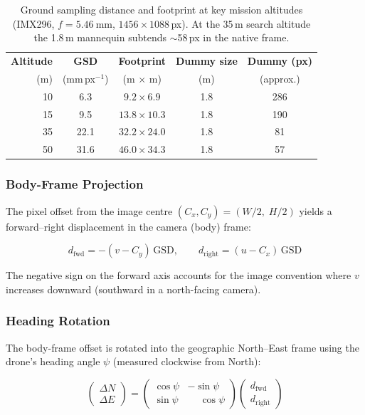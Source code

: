 \begin{table}[ht]
  \centering
  \caption{Ground sampling distance and footprint at key mission altitudes (IMX296, $f = \SI{5.46}{\milli\metre}$, $1456\!\times\!1088$\,px).  At the 35\,m search altitude the 1.8\,m mannequin subtends ${\sim}$58\,px in the native frame.}
  \label{tab:gsd-altitude}
  \begin{tabular}{rcccc}
    \toprule
    \textbf{Altitude} & \textbf{GSD} & \textbf{Footprint} & \textbf{Dummy size} & \textbf{Dummy (px)} \\
    (m) & (mm\,px$^{-1}$) & (m $\times$ m) & (m) & (approx.) \\
    \midrule
    10  & 6.3  & $9.2 \times 6.9$   & 1.8 & 286 \\
    15  & 9.5  & $13.8 \times 10.3$ & 1.8 & 190 \\
    35  & 22.1 & $32.2 \times 24.0$ & 1.8 & 81  \\
    50  & 31.6 & $46.0 \times 34.3$ & 1.8 & 57  \\
    \bottomrule
  \end{tabular}
\end{table}

\subsubsection{Body-Frame Projection}

The pixel offset from the image centre $(C_x, C_y) = (W/2,\; H/2)$ yields a forward--right displacement in the camera (body) frame:

\begin{equation}\label{eq:body-deep}
  d_\mathrm{fwd} = -(v - C_y)\,\mathrm{GSD},
  \qquad
  d_\mathrm{right} = (u - C_x)\,\mathrm{GSD}
\end{equation}

\noindent The negative sign on the forward axis accounts for the image convention where $v$ increases downward (southward in a north-facing camera).

\subsubsection{Heading Rotation}

The body-frame offset is rotated into the geographic North--East frame using the drone's heading angle $\psi$ (measured clockwise from North):

\begin{equation}\label{eq:rotation-deep}
  \begin{pmatrix} \Delta N \\ \Delta E \end{pmatrix}
  =
  \begin{pmatrix} \cos\psi & -\sin\psi \\ \sin\psi & \phantom{-}\cos\psi \end{pmatrix}
  \begin{pmatrix} d_\mathrm{fwd} \\ d_\mathrm{right} \end{pmatrix}
\end{equation}

